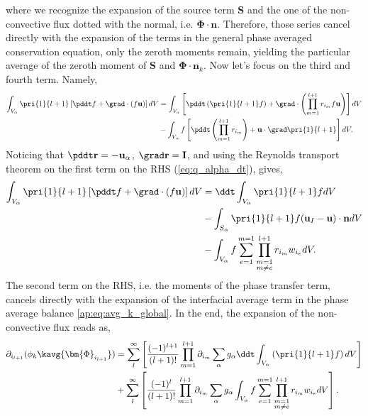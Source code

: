 where we recognize the expansion of the source term \textbf{S} and the one of the non-convective flux dotted with the normal, i.e. $\bm{\Phi}\cdot\textbf{n}$.
Therefore, those series cancel directly with the expansion of the terms in the general phase averaged conservation equation, only the zeroth moments remain, yielding the particular average of the zeroth moment of \textbf{S} and $\bm{\Phi}\cdot \textbf{n}_k$. 
Now let's focus on the third and fourth term. Namely, 
\begin{align*}
    \int_{V_\alpha}\pri{1}{l+1}\left[
        \pddt f 
        + 
        \grad \cdot (f \textbf{u}) 
    \right]dV
    &= \int_{V_\alpha} \left[
    \pddt \left(\pri{1}{l+1}  f \right)
    + 
    \grad \cdot \left(
    \prod^{l+1}_{m=1}
    r_{i_m} f \textbf{u}
    \right) \right]dV   \\ 
    &- \int_{V_\alpha}f\left[
        \pddt \left(\prod^{l+1}_{m=1}
        r_{i_m} \right)
        +
        \textbf{u} \cdot
        \grad \pri{1}{l+1}  
    \right]
    dV.\\
\end{align*}
Noticing that $\pddt \textbf{r} = - \textbf{u}_\alpha$, $\grad \textbf{r} = \textbf{I}$, and using the Reynolds transport theorem on the first term on the RHS (\ref{eq:q_alpha_dt}), gives, 
\begin{align*}
    \int_{V_\alpha}\pri{1}{l+1}\left[
        \pddt f 
        + 
        \grad \cdot (f \textbf{u}) 
    \right]dV
    &= \ddt \int_{V_\alpha} 
    \pri{1}{l+1}  f dV   \\
    &- \int_{S_\alpha} 
    \pri{1}{l+1}  f (\textbf{u}_I - \textbf{u})\cdot \textbf{n} dV \\
    &- \int_{V_\alpha}f \sum_{e=1}^{m=1} 
    \prod^{l+1}_{\substack{m=1\\ m\neq e}} 
    r_{i_m} 
    w_{i_e}
    dV.\\
\end{align*}
The second term on the RHS, i.e. the moments of the phase transfer term, cancels directly with the expansion of the interfacial average term in the phase average balance \ref{ap:eq:avg_k_global}.
In the end, the expansion of the non-convective flux reads as,
\begin{align*}
    \partial_{i_{l+1}}
    (\phi_k \kavg{\bm{\Phi}_{i_{l+1}}})
    & =\sum_l^\infty
    \left[
        \frac{(-1)^{l+1}}{(l+1)!}
        \prod^{l+1}_{m=1}
        \partial_{i_m}
        \sum_{\alpha}
        g_{\alpha}\ddt \int_{V_\alpha}
        \left(\pri{1}{l+1}  f \right)dV
    \right]\\
    &+\sum_l^\infty
    \left[
        \frac{(-1)^{l}}{(l+1)!}
        \prod^{l+1}_{m=1}
        \partial_{i_m}
        \sum_{\alpha}
        g_{\alpha}\int_{V_\alpha}
        f\sum_{e=1}^{m=1} 
        \prod^{l+1}_{\substack{m=1\\ m\neq e}} 
        r_{i_m} 
        w_{i_e}
         dV
    \right].\\
\end{align*}
